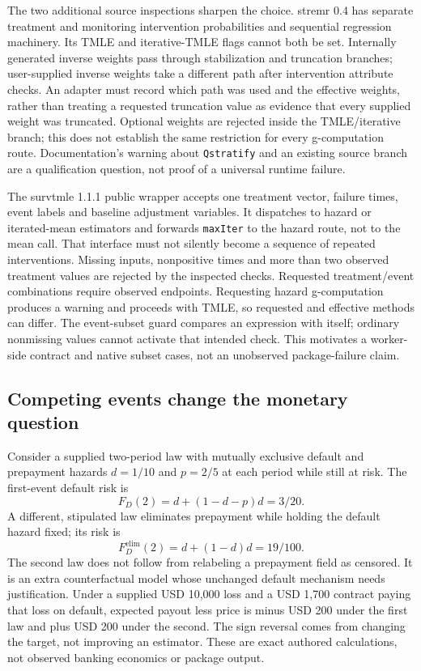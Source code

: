 The two additional source inspections sharpen the choice. stremr 0.4 has
separate treatment and monitoring intervention probabilities and sequential
regression machinery. Its TMLE and iterative-TMLE flags cannot both be set.
Internally generated inverse weights pass through stabilization and truncation
branches; user-supplied inverse weights take a different path after intervention
attribute checks. An adapter must record which path was used and the effective
weights, rather than treating a requested truncation value as evidence that
every supplied weight was truncated. Optional weights are rejected inside
the TMLE/iterative branch; this does not establish the same restriction for
every g-computation route. Documentation's warning about \texttt{Qstratify}
and an existing source branch are a qualification question, not proof of a
universal runtime failure. \citep{exec23_longr_stremr}

The survtmle 1.1.1 public wrapper accepts one treatment vector, failure times,
event labels and baseline adjustment variables. It dispatches to hazard or
iterated-mean estimators and forwards \texttt{maxIter} to the hazard route,
not to the mean call. That interface must not silently become a sequence of
repeated interventions. Missing inputs, nonpositive times and more than two
observed treatment values are rejected by the inspected checks. Requested
treatment/event combinations require observed endpoints. Requesting hazard
g-computation produces a warning and proceeds with TMLE, so requested and
effective methods can differ. The event-subset guard compares an expression
with itself; ordinary nonmissing values cannot activate that intended check.
This motivates a worker-side contract and native subset cases, not an
unobserved package-failure claim. \citep{exec23_longr_survtmle}

\subsection{Competing events change the monetary question}
\label{eq:exec23-longr-events}
Consider a supplied two-period law with mutually exclusive default and
prepayment hazards $d=1/10$ and $p=2/5$ at each period while still at risk.
The first-event default risk is
\[
 F_D(2)=d+(1-d-p)d=3/20.
\]
A different, stipulated law eliminates prepayment while holding the default
hazard fixed; its risk is
\[
 F_D^{\mathrm{elim}}(2)=d+(1-d)d=19/100.
\]
The second law does not follow from relabeling a prepayment field as censored.
It is an extra counterfactual model whose unchanged default mechanism needs
justification. Under a supplied USD 10,000 loss and a USD 1,700 contract
paying that loss on default, expected payout less price is minus USD 200
under the first law and plus USD 200 under the second. The sign reversal
comes from changing the target, not improving an estimator. These are exact
authored calculations, not observed banking economics or package output.
\citep{exec23_longr_reference}

